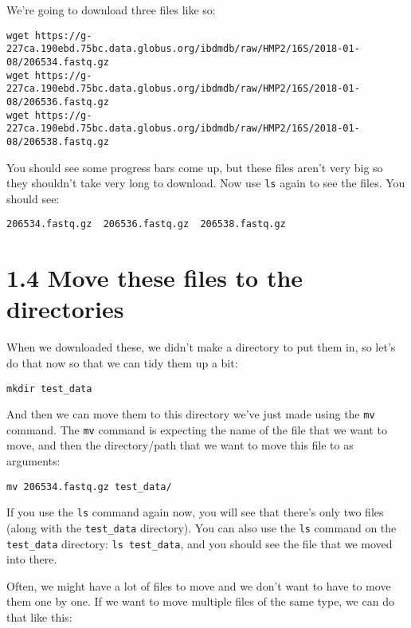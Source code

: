 \documentclass[
]{book}
\begin{document}
We're going to download three files like so:

\begin{verbatim}
wget https://g-227ca.190ebd.75bc.data.globus.org/ibdmdb/raw/HMP2/16S/2018-01-08/206534.fastq.gz
wget https://g-227ca.190ebd.75bc.data.globus.org/ibdmdb/raw/HMP2/16S/2018-01-08/206536.fastq.gz
wget https://g-227ca.190ebd.75bc.data.globus.org/ibdmdb/raw/HMP2/16S/2018-01-08/206538.fastq.gz
\end{verbatim}

You should see some progress bars come up, but these files aren't very big so they shouldn't take very long to download. Now use \texttt{ls} again to see the files. You should see:

\begin{verbatim}
206534.fastq.gz  206536.fastq.gz  206538.fastq.gz
\end{verbatim}

\section{1.4 Move these files to the directories}\label{move-these-files-to-the-directories}

When we downloaded these, we didn't make a directory to put them in, so let's do that now so that we can tidy them up a bit:

\begin{verbatim}
mkdir test_data
\end{verbatim}

And then we can move them to this directory we've just made using the \texttt{mv} command. The \texttt{mv} command is expecting the name of the file that we want to move, and then the directory/path that we want to move this file to as arguments:

\begin{verbatim}
mv 206534.fastq.gz test_data/
\end{verbatim}

If you use the \texttt{ls} command again now, you will see that there's only two files (along with the \texttt{test\_data} directory). You can also use the \texttt{ls} command on the \texttt{test\_data} directory: \texttt{ls\ test\_data}, and you should see the file that we moved into there.

Often, we might have a lot of files to move and we don't want to have to move them one by one. If we want to move multiple files of the same type, we can do that like this:
\end{document}
